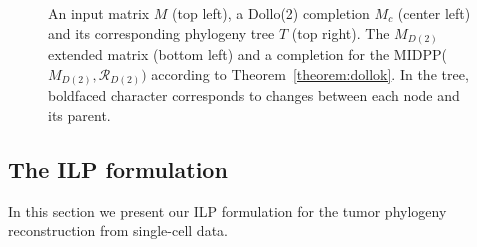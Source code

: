 \documentclass[a4paper,USenglish]{article}
\theoremstyle{definition}
\begin{document}
\begin{figure}[tb!]
  \begin{minipage}{.5\linewidth}
  \end{minipage}
 \begin{minipage}{.5\linewidth}
      \end{minipage}


\caption{An input matrix $M$ (top left), a Dollo(2) completion $M_c$ (center
  left) and its corresponding phylogeny tree $T$ (top right). 
  The $M_{D(2)}$ extended matrix (bottom left) 
  and a completion for the MIDPP($M_{D(2)},\mathcal R_{D(2)})$
  according to Theorem~\ref{theorem:dollok}.
%
In the tree, boldfaced character corresponds to changes between each node and its parent.
}  
    \label{fig:M_e}
  \end{figure}

\subsection{The ILP formulation}
\label{sec:ilp}
In this section we present our ILP formulation for the tumor phylogeny reconstruction from
single-cell data.
\end{document}
